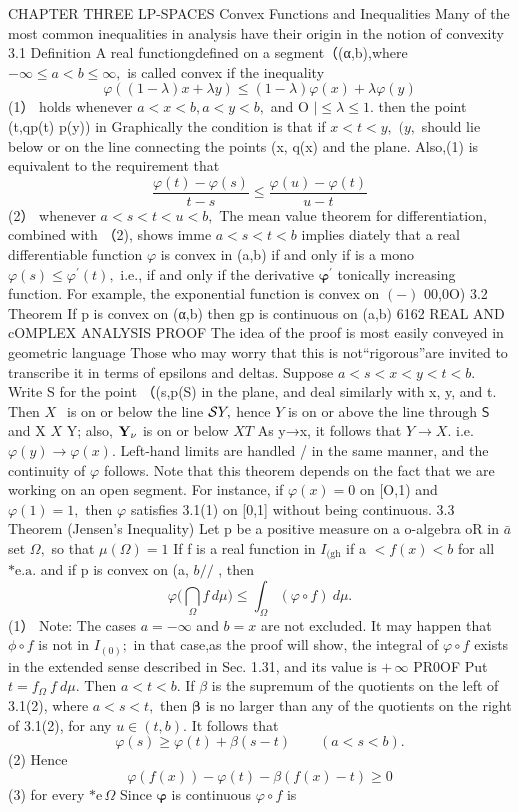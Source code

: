 CHAPTER THREE LP-SPACES Convex Functions and Inequalities Many of the most common inequalities in analysis have their origin in the notion of convexity 3.1 Definition A real functiongdefined on a segment（(α,b),where $-\infty\leq a<b\leq\infty,$ is called convex if the inequality $$ \varphi((1-\lambda)x+\lambda y)\leq(1-\lambda)\varphi(x)+\lambda\varphi(y) $$ (1） holds whenever $a<x<b,a<y<b,$ and O $|\leq\lambda\leq1.$ then the point (t,qp(t) p(y)) in Graphically the condition is that if $x<t<y,$ $(y,$ should lie below or on the line connecting the points (x, q(x) and the plane. Also,(1) is equivalent to the requirement that $$ \frac{\varphi(t)-\varphi(s)}{t-s}\leq\frac{\varphi(u)-\varphi(t)}{u-t} $$ (2） whenever $a<s<t<u<b,$ The mean value theorem for differentiation, combined with （2), shows imme $a<s<t<b$ implies diately that a real differentiable function $\varphi$ is convex in (a,b) if and only if is a mono $\varphi(s)\leq\varphi^{\prime}(t),$ i.e., if and only if the derivative ${\boldsymbol{\varphi}}^{\prime}$ tonically increasing function. For example, the exponential function is convex on $\left(-\right)$ 00,0O) 3.2 Theorem If p is convex on (α,b) then gp is continuous on (a,b) 6162 REAL AND cOMPLEX ANALYSIS PROOF The idea of the proof is most easily conveyed in geometric language Those who may worry that this is not“rigorous”are invited to transcribe it in terms of epsilons and deltas. Suppose $a<s<x<y<t<b.$ Write S for the point （(s,p(S) in the plane, and deal similarly with x, y, and t. Then $\textstyle X{\ ~}$ is on or below the line ${\cal S}Y,$ hence ${\mathbf{}}Y$ is on or above the line through $\boldsymbol{\mathsf{S}}$ and X $X$ Y; also, ${\bf Y_{\nu}}$ is on or below $X T$ As y→x, it follows that $\scriptstyle Y\to X.$ i.e. $\varphi(y)\to\varphi(x).$ Left-hand limits are handled / in the same manner, and the continuity of $\varphi$ follows. Note that this theorem depends on the fact that we are working on an open segment. For instance, if $\varphi(x)=0$ on [O,1) and $\varphi(1)=1,$ then $\varphi$ satisfies 3.1(1) on [0,1] without being continuous. 3.3 Theorem (Jensen's Inequality) Let p be a positive measure on a o-algebra oR in $\bar{a}$ set $\Omega,$ so that $\mu(\Omega)=1$ If f is a real function in $\scriptstyle I_{\mathrm{(gh}}$ if a $<f(x)<b$ for all $\mathrm{*e.a.}$ and if p is convex on (a, $b\mathrm{/}\mathrm{/}$ , then $$ \varphi{\Biggl(}\bigcap_{\Omega}f\,d\mu{\Biggr)}\leq\int_{\Omega}(\varphi\circ f)\ d\mu. $$ (1） Note: The cases $a=-\infty$ and $b=x$ are not excluded. It may happen that $\scriptstyle{\phi\circ f}$ is not in $\scriptstyle I_{(0)};$ in that case,as the proof will show, the integral of $\varphi\circ f$ exists in the extended sense described in Sec. 1.31, and its value is $\scriptstyle+\,\infty$ PR0OF Put $t=f_{\Omega}\ f\ d\mu.$ Then $a<t<b.$ If $\beta$ is the supremum of the quotients on the left of 3.1(2), where $a<s<t,$ then $\boldsymbol{\beta}$ is no larger than any of the quotients on the right of 3.1(2), for any $u\in(t,b).$ It follows that $$ \varphi(s)\geq\varphi(t)+\beta(s-t)\qquad(a<s<b). $$ (2) Hence $$ \varphi(f(x))-\varphi(t)-\beta(f(x)-t)\geq0 $$ (3) for every $\mathrm{*e}\,\Omega$ Since $\boldsymbol{\varphi}$ is continuous $\varphi\circ f$ is 